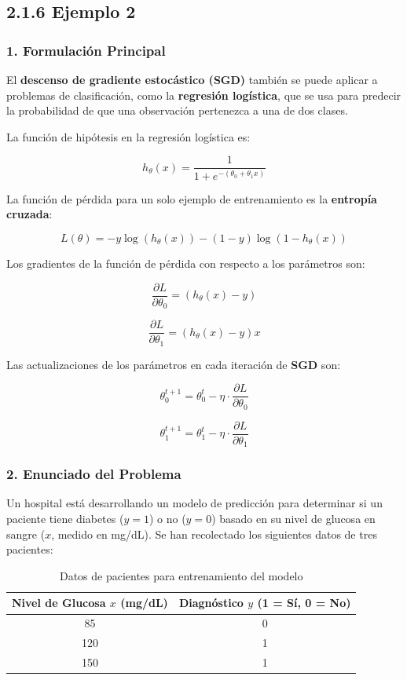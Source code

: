 \documentclass[a5paper]{article}
\begin{document}
	
	\subsection*{2.1.6 Ejemplo 2}
	
	\subsubsection*{1. Formulación Principal}
	
	El \textbf{descenso de gradiente estocástico (SGD)} también se puede aplicar a problemas de clasificación, como la \textbf{regresión logística}, que se usa para predecir la probabilidad de que una observación pertenezca a una de dos clases.  
	
	La función de hipótesis en la regresión logística es:
	
	\[
	h_\theta(x) = \frac{1}{1 + e^{-(\theta_0 + \theta_1 x)}}
	\]
	
	La función de pérdida para un solo ejemplo de entrenamiento es la \textbf{entropía cruzada}:
	
	\[
	L(\theta) = - y \log(h_\theta(x)) - (1 - y) \log(1 - h_\theta(x))
	\]
	
	Los gradientes de la función de pérdida con respecto a los parámetros son:
	
	\[
	\frac{\partial L}{\partial \theta_0} = (h_\theta(x) - y)
	\]
	
	\[
	\frac{\partial L}{\partial \theta_1} = (h_\theta(x) - y) x
	\]
	
	Las actualizaciones de los parámetros en cada iteración de \textbf{SGD} son:
	
	\[
	\theta_0^{t+1} = \theta_0^t - \eta \cdot \frac{\partial L}{\partial \theta_0}
	\]
	
	\[
	\theta_1^{t+1} = \theta_1^t - \eta \cdot \frac{\partial L}{\partial \theta_1}
	\]
	
	\subsubsection*{2. Enunciado del Problema}
	
	Un hospital está desarrollando un modelo de predicción para determinar si un paciente tiene diabetes (\( y = 1 \)) o no (\( y = 0 \)) basado en su nivel de glucosa en sangre (\( x \), medido en mg/dL). Se han recolectado los siguientes datos de tres pacientes:
	
	\begin{table}[h]
		\centering
		\begin{tabular}{|c|c|}
			\hline
			Nivel de Glucosa \( x \) (mg/dL) & Diagnóstico \( y \) (1 = Sí, 0 = No) \\
			\hline
			85 & 0 \\
			120 & 1 \\
			150 & 1 \\
			\hline
		\end{tabular}
		\caption{Datos de pacientes para entrenamiento del modelo}
	\end{table}
	
\end{document}
